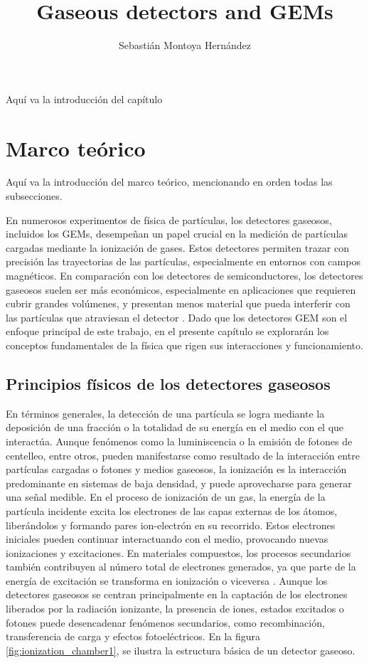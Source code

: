 \documentclass{article}
\title{\textbf{Gaseous detectors and GEMs} }
\author{Sebastián Montoya Hernández}
\begin{document}
\maketitle 
\setcounter{section}{0}
Aquí va la introducción del capítulo
\newpage
\section{Marco teórico}

Aquí va la introducción del marco teórico, mencionando en orden todas las subsecciones.

En numerosos experimentos de física de partículas, los detectores gaseosos, incluidos los GEMs, desempeñan un papel crucial en la medición de partículas cargadas mediante la ionización de gases. Estos detectores permiten trazar con precisión las trayectorias de las partículas, especialmente en entornos con campos magnéticos. En comparación con los detectores de semiconductores, los detectores gaseosos suelen ser más económicos, especialmente en aplicaciones que requieren cubrir grandes volúmenes, y presentan menos material que pueda interferir con las partículas que atraviesan el detector \cite{sauli2015gaseous}. Dado que los detectores GEM son el enfoque principal de este trabajo, en el presente capítulo se explorarán los conceptos fundamentales de la física que rigen sus interacciones y funcionamiento.

\subsection{Principios físicos de los detectores gaseosos}

\noindent En términos generales, la detección de una partícula se logra mediante la deposición de una fracción o la totalidad de su energía en el medio con el que interactúa. Aunque fenómenos como la luminiscencia o la emisión de fotones de centelleo, entre otros, pueden manifestarse como resultado de la interacción entre partículas cargadas o fotones y medios gaseosos, la ionización es la interacción predominante en sistemas de baja densidad, y puede aprovecharse para generar una señal medible. En el proceso de ionización de un gas, la energía de la partícula incidente excita los electrones de las capas externas de los átomos, liberándolos y formando pares ion-electrón en su recorrido. Estos electrones iniciales pueden continuar interactuando con el medio, provocando nuevas ionizaciones y excitaciones. En materiales compuestos, los procesos secundarios también contribuyen al número total de electrones generados, ya que parte de la energía de excitación se transforma en ionización o viceversa \cite{kolanoski2020particle1}. Aunque los detectores gaseosos se centran principalmente en la captación de los electrones liberados por la radiación ionizante, la presencia de iones, estados excitados o fotones puede desencadenar fenómenos secundarios, como recombinación, transferencia de carga y efectos fotoeléctricos. En la figura \ref{fig:ionization_chamber1}, se ilustra la estructura básica de un detector gaseoso.
\end{document}
